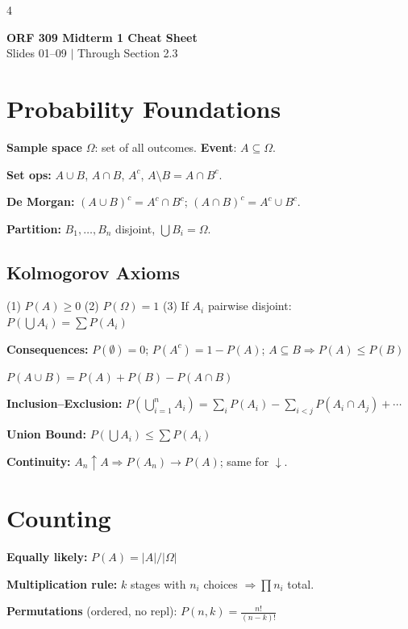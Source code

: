 \documentclass[6pt]{article}
\begin{document}
\begin{multicols}{4}

\begin{center}
{\large\textbf{ORF 309 Midterm 1 Cheat Sheet}}\\[-2pt]
{\scriptsize Slides 01--09 $\mid$ Through Section 2.3}
\end{center}

\section{Probability Foundations}

\textbf{Sample space} $\Omega$: set of all outcomes. \textbf{Event}: $A \subseteq \Omega$.

\textbf{Set ops:} $A \cup B$, $A \cap B$, $A^c$, $A \setminus B = A \cap B^c$.

\textbf{De Morgan:} $(A \cup B)^c = A^c \cap B^c$;\; $(A \cap B)^c = A^c \cup B^c$.

\textbf{Partition:} $B_1,\ldots,B_n$ disjoint, $\bigcup B_i = \Omega$.

\subsection{Kolmogorov Axioms}
(1) $P(A) \geq 0$\; (2) $P(\Omega)=1$\; (3) If $A_i$ pairwise disjoint: $P(\bigcup A_i) = \sum P(A_i)$

\textbf{Consequences:} $P(\emptyset)=0$; $P(A^c)=1-P(A)$; $A\subseteq B \Rightarrow P(A)\leq P(B)$

$P(A\cup B) = P(A)+P(B)-P(A\cap B)$

\textbf{Inclusion--Exclusion:}
$P\!\left(\bigcup_{i=1}^n A_i\right) = \sum_i P(A_i) - \sum_{i<j} P(A_i\cap A_j) + \cdots$

\textbf{Union Bound:} $P(\bigcup A_i) \leq \sum P(A_i)$

\textbf{Continuity:} $A_n\uparrow A \Rightarrow P(A_n)\to P(A)$; same for $\downarrow$.

\section{Counting}

\textbf{Equally likely:} $P(A)=|A|/|\Omega|$

\textbf{Multiplication rule:} $k$ stages with $n_i$ choices $\Rightarrow \prod n_i$ total.

\textbf{Permutations} (ordered, no repl): $P(n,k)=\frac{n!}{(n-k)!}$


\end{multicols}
\end{document}
